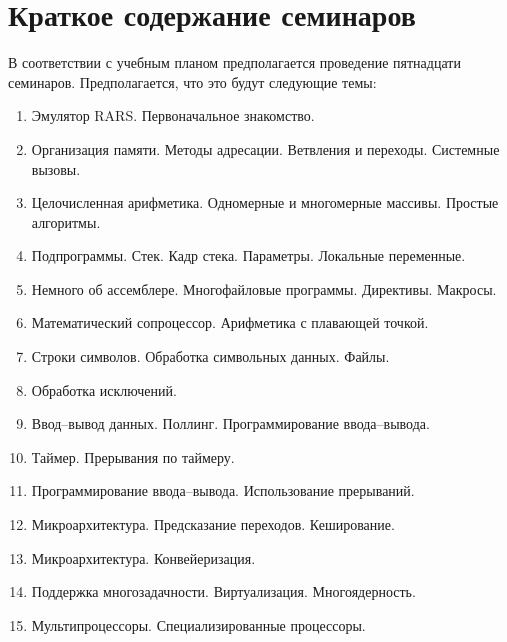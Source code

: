 \section*{Краткое содержание семинаров}

В соответствии с учебным планом предполагается проведение пятнадцати семинаров. Предполагается, что это будут следующие темы:
\begin{enumerate}
	\item Эмулятор RARS. Первоначальное знакомство.
    \item Организация памяти. Методы адресации. Ветвления и переходы. Системные вызовы.
    \item Целочисленная арифметика. Одномерные и многомерные массивы. Простые алгоритмы.
    \item Подпрограммы. Стек. Кадр стека. Параметры. Локальные переменные.
    \item Немного об ассемблере. Многофайловые программы. Директивы. Макросы.
    \item Математический сопроцессор. Арифметика с плавающей точкой.
    \item Строки символов. Обработка символьных данных. Файлы.
    \item Обработка исключений.
    \item Ввод--вывод данных. Поллинг. Программирование ввода--вывода.
    \item Таймер. Прерывания по таймеру.
    \item Программирование ввода--вывода. Использование прерываний.
    \item Микроархитектура. Предсказание переходов. Кеширование.
    \item Микроархитектура. Конвейеризация.
    \item Поддержка многозадачности. Виртуализация. Многоядерность.
    \item Мультипроцессоры. Специализированные процессоры.
\end{enumerate}



